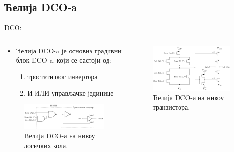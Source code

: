 \documentclass[aspectratio=169]{beamer}
\def \DCO  {DCO} %
\begin{document}
\subsection{Ћелија \DCO-a}

\begin{frame}{\DCO: \subsecname}
    \begin{columns}[t]
        \begin{column}{0.5\textwidth}
            \begin{itemize}
                \item Ћелија \DCO-a је основна градивни блок \DCO-a, који се састоји од: 
		\medskip
                \begin{enumerate}
                	\item тростатичког инвертора
                	\item И-ИЛИ управљачке јединице
                \end{enumerate}
            \end{itemize}
            \begin{figure}[!t]
	            \centering
    	        \includegraphics[scale=0.45]{slike/prezentacija/DCO_cell_circuits.pdf}
        	    \caption{Ћелија \DCO-а на нивоу логичких кола.}
            	\label{DCO_cell_circuits}
            \end{figure}
		\end{column}
		\begin{column}{0.5\textwidth}
	    \medskip
            \begin{figure}[!t]
                \centering
                \includegraphics[scale=0.45]{slike/prezentacija/DCO_cell_transistors.pdf}
                \caption{Ћелија \DCO-а на нивоу транзистора.}
                \label{DCO_cell_transistors}
            \end{figure}
		\end{column}
	\end{columns}
\end{frame}
\end{document}
